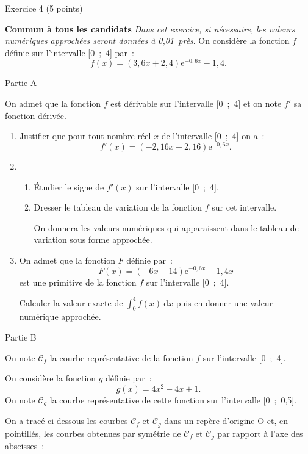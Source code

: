
\begin{h2}Exercice 4 (5 points)\end{h2}
\textbf{Commun à tous les candidats}
\medskip
\emph{Dans cet exercice, si nécessaire, les valeurs numériques approchées seront données à 0,01~près}.
\medskip
On considère la fonction $f$ définie sur l'intervalle [0~;~4] par~:
\[f(x) = (3,6x + 2,4)\text{e}^{-0,6x}- 1,4.\]
\begin{center}\begin{h3}Partie A \end{h3}\end{center}
On admet que la fonction $f$ est dérivable sur l'intervalle [0~;~4] et on note $f'$ sa fonction dérivée.
\medskip
\begin{enumerate}
     \item Justifier que pour tout nombre réel $x$ de l'intervalle [0~;~4] on a~:
     \[f'(x) = (- 2,16 x + 2,16)\text{e}^{-0,6x}.\]
     \item
     \begin{enumerate}[label=\alph*.]
          \item Étudier le signe de $f'(x)$ sur l'intervalle [0~;~4].
          \item Dresser le tableau de variation de la fonction $f$ sur cet intervalle.
          \par
          On donnera les valeurs numériques qui apparaissent dans le tableau de variation sous
          forme approchée.
     \end{enumerate}
     \item  On admet que la fonction $F$ définie par~:
     \[F(x) = (- 6x - 14)\text{e}^{-0,6x} - 1,4x\]
     est une primitive de la fonction $f$ sur l'intervalle [0~;~4].
     \par
     Calculer la valeur exacte de $\displaystyle\int_0^4  f(x)\:\text{d}x$ puis en donner une valeur numérique approchée.
\end{enumerate}
\begin{center}\begin{h3}Partie B \end{h3}\end{center}
On note $\mathscr{C}_f$ la courbe représentative de la fonction $f$ sur l'intervalle [0~;~4].
\par
On considère la fonction $g$ définie par~:
\[g(x) = 4x^2 - 4x + 1.\]
On note $\mathscr{C}_g$ la courbe représentative de cette fonction sur l'intervalle [0~;~0,5].
\par
On a tracé ci-dessous les courbes $\mathscr{C}_f$ et $\mathscr{C}_g$ dans un repère d'origine O et, en pointillés, les courbes obtenues par symétrie de $\mathscr{C}_f$ et $\mathscr{C}_g$ par rapport à l'axe des abscisses~:
